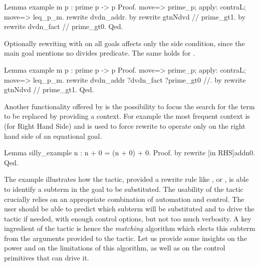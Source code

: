 \begin{coq}{}{}
Lemma example m p : prime p -> p %
Proof.
move=> prime_p; apply: contraL; move=> leq_p_m.
rewrite dvdn_addr.
  by rewrite gtnNdvd // prime_gt1.
by rewrite dvdn_fact // prime_gt0.
Qed.
\end{coq}

Optionally rewriting with  on all goals affects only
the side condition, since the main goal mentions no divides predicate.
The same holds for .

\begin{coq}{}{}
Lemma example m p : prime p -> p %
Proof.
move=> prime_p; apply: contraL; move=> leq_p_m.
rewrite dvdn_addr ?dvdn_fact ?prime_gt0 //.
by rewrite gtnNdvd // prime_gt1.
Qed.
\end{coq}

Another functionality offered by  is the possibility
to focus the search for the term to be replaced by providing a
context.  For example the most frequent context is  (for Right
Hand Side) and is used to force rewrite to operate only on the right
hand side of an equational goal.

\begin{coq}{}{}
Lemma silly_example n : n + 0 = (n + 0) + 0.
Proof. by rewrite [in RHS]addn0. Qed.
\end{coq}

\label{sec:rewrite2}

The example  illustrates how the  tactic, provided a
rewrite rule like ,  or , is able
to identify a
subterm in the goal to be substituted. The usability of the
tactic crucially relies on an appropriate combination of automation
and control. The user should be able to predict which subterm will be
substituted and to drive the tactic if needed, with enough control
options, but not too much verbosity. A key ingredient of the
 tactic is hence the \emph{matching} algorithm which
elects this subterm from the arguments provided to the tactic. Let us
provide some insights on the power and on the limitations of this
algorithm, as well as on the control primitives that can drive it.

